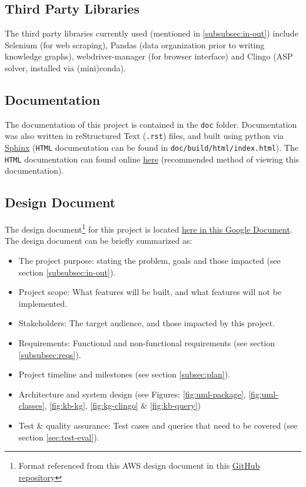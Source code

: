 \documentclass[12pt]{article}
\def \docLink{https://cse505.readthedocs.io/en/latest/?badge=latest}
\def \desDocLink{https://docs.google.com/document/d/1t48in8rdzC_VOijfAOP23C_YgAQxkow5eaE7AXEVUYM/edit?usp=sharing}
\begin{document}
    \subsection{Third Party Libraries}
    \label{subsec:thirdparty}

    The third party libraries currently used (mentioned in \ref{subsubsec:in-out}) include Selenium (for web scraping), Pandas (data organization prior to writing knowledge graphs), webdriver-manager (for browser interface) and Clingo (ASP solver, installed via (mini)conda).

    \subsection{Documentation}
    \label{subsec:docs}

    The documentation of this project is contained in the {\tt{doc}} folder. Documentation was also written in reStructured Text ({\tt{.rst}}) files, and built using python via \href{https://www.sphinx-doc.org/en/master/}{Sphinx} ({\tt{HTML}} documentation can be found in {\tt{doc/build/html/index.html}}). The {\tt{HTML}} documentation can found online \href{\docLink}{here} (recommended method of viewing this documentation).

    \subsection{Design Document}
    \label{subsec:design-docs}

    The design document\footnote{Format referenced from this AWS design document in this \href{https://github.com/aws/aws-sam-cli/blob/develop/designs/intrinsics_design.md}{GitHub repository}} for this project is located \href{\desDocLink}{here in this Google Document}. The design document can be briefly summarized as:

    \begin{itemize}
        \item The project purpose: stating the problem, goals and those impacted (see section \ref{subsubsec:in-out}).
        \item Project scope: What features will be built, and what features will not be implemented.
        \item Stakeholders: The target audience, and those impacted by this project.
        \item Requirements: Functional and non-functional requirements (see section \ref{subsubsec:reqs}).
        \item Project timeline and milestones (see section \ref{subsec:plan}).
        \item Architecture and system design (see Figures: \ref{fig:uml-package}, \ref{fig:uml-classes}, \ref{fig:kb-kg}, \ref{fig:kg-clingo} \& \ref{fig:kb-query})
        \item Test \& quality assurance: Test cases and queries that need to be covered (see section \ref{sec:test-eval}).
    \end{itemize}
    
\end{document}
